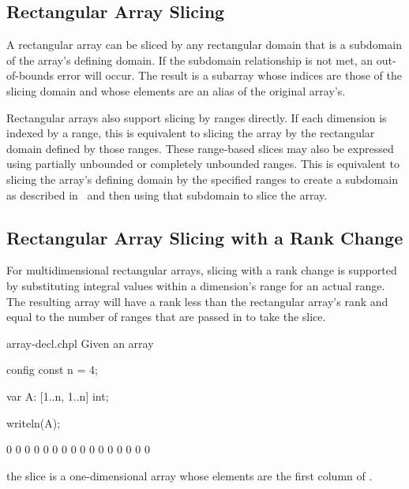 \subsection{Rectangular Array Slicing}
\label{Rectangular_Array_Slicing}

A rectangular array can be sliced by any rectangular domain that is a
subdomain of the array's defining domain.  If the subdomain
relationship is not met, an out-of-bounds error will occur.  The
result is a subarray whose indices are those of the slicing domain and
whose elements are an alias of the original array's.

Rectangular arrays also support slicing by ranges directly.  If each
dimension is indexed by a range, this is equivalent to slicing the
array by the rectangular domain defined by those ranges.  These
range-based slices may also be expressed using partially unbounded or
completely unbounded ranges.  This is equivalent to slicing the
array's defining domain by the specified ranges to create a subdomain
as described in~ and then using that subdomain to slice
the array.

\subsection{Rectangular Array Slicing with a Rank Change}
\label{Rectangular_Array_Slicing_With_Rank_Change}

For multidimensional rectangular arrays, slicing with a rank change is
supported by substituting integral values within a dimension's range
for an actual range.  The resulting array will have a rank less than
the rectangular array's rank and equal to the number of ranges that are
passed in to take the slice.

\begin{chapelexample}{array-decl.chpl}
Given an array
\begin{chapelpre}
config const n = 4;
\end{chapelpre}
\begin{chapel}
var A: [1..n, 1..n] int;
\end{chapel}
\begin{chapelpost}
writeln(A);
\end{chapelpost}
\begin{chapeloutput}
0 0 0 0
0 0 0 0
0 0 0 0
0 0 0 0
\end{chapeloutput}
the slice  is a one-dimensional array whose elements
are the first column of .
\end{chapelexample}


